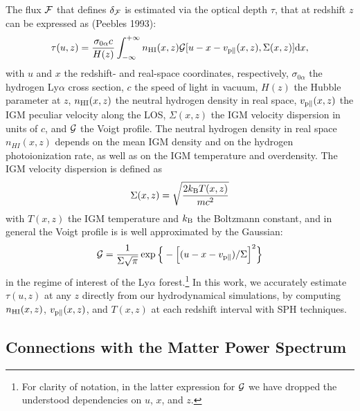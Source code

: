 \documentclass{emulateapj}
\begin{document}
The flux ${{\cal{F}}}$ that defines  $\delta_{{\cal{F}}}$ is estimated via the optical depth $\tau$, 
that at redshift $z$ can be expressed as (Peebles 1993):
\begin{equation}
\begin{tiny}
\tau(u,z) = {\sigma_{0 \alpha} c \over H(z) } \int_{- \infty}^{+ \infty} n_{\rm HI}(x,z) {{\cal{G}}} [u-x - v_{\rm p \parallel}(x,z),  \Sigma(x,z)] {\rm d}x,
\end{tiny}
\label{eq_tau_theory}
\end{equation}
with $u$ and $x$ the redshift- and real-space coordinates, respectively,
 $\sigma_{0 \alpha}$ the hydrogen Ly$\alpha$ cross section, $c$ the speed of light in vacuum, 
$H(z)$ the Hubble parameter at $z$,  
$n_{\rm HI}(x,z)$ the neutral hydrogen density in real space,
$v_{\rm p \parallel}(x,z)$ the IGM peculiar velocity along the LOS,
$\Sigma(x,z)$ the IGM velocity dispersion in units of $c$,
and ${{\cal{G}}}$  the Voigt profile. 
The neutral hydrogen density in real space $n_{HI}(x,z)$ 
depends on the mean IGM density and on the hydrogen photoionization rate, as well as on the IGM temperature and overdensity.
The IGM velocity dispersion is
defined as
\begin{equation}
\Sigma(x,z) = \sqrt{{2 k_{\rm B} T(x,z) \over m c^2}}
\label{}
\end{equation}
with $T(x,z)$ the IGM temperature and $k_{\rm B}$ the Boltzmann constant,
and in general the Voigt profile is
 is well approximated by the Gaussian:
\begin{equation}
{{\cal{G}}} = { 1 \over \Sigma  \sqrt{\pi} }  \exp \Big \{ - \Big [ ( u-x-v_{\rm p \parallel} )  / \Sigma   \Big ]^2 \Big \}  
\label{}
\end{equation}
in the regime of interest of the Ly$\alpha$ forest.\footnote{For clarity of notation, in the latter expression for ${{\cal{G}}}$ we have dropped the understood dependencies on $u$, $x$, and $z$.}
In this work, we accurately estimate $\tau(u,z)$ at any $z$ directly from our hydrodynamical simulations, by computing
$n_{\rm HI}(x,z)$, $v_{\rm p \parallel}(x,z)$, and $T(x,z)$ at each redshift interval with SPH techniques.  


\subsection{Connections with the Matter Power Spectrum}
\end{document}
